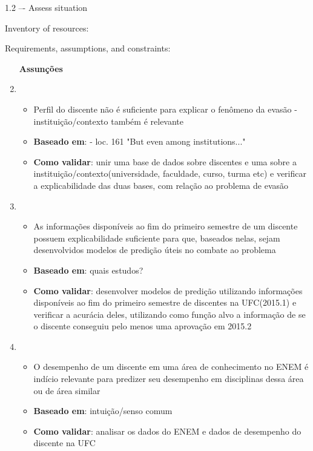 \documentclass{article}
\begin{document}
1.2 –- Assess situation

Inventory of resources:

Requirements, assumptions, and constraints:

\begin{enumerate}
\item [\textbf{Assunções}]
\item 
	\begin{itemize}
	\item Perfil do discente não é suficiente para explicar o fenômeno da evasão - instituição/contexto também é relevante
	\item \textbf{Baseado em}: \cite{tinto_leaving} - loc. 161 "But even among institutions..."
	\item \textbf{Como validar}: unir uma base de dados sobre discentes e uma sobre a instituição/contexto(universidade, faculdade, curso, turma etc) e verificar a explicabilidade das duas bases, com relação ao problema de evasão
	\end{itemize}

\item 
	\begin{itemize}
	\item As informações disponíveis ao fim do primeiro semestre de um discente possuem explicabilidade suficiente para que, baseados nelas, sejam desenvolvidos modelos de predição úteis no combate ao problema
	\item \textbf{Baseado em}: quais estudos? \cite{tinto_completing} 
	\item \textbf{Como validar}: desenvolver modelos de predição utilizando informações disponíveis ao fim do primeiro semestre de discentes na UFC(2015.1) e verificar a acurácia deles, utilizando como função alvo a informação de se o discente conseguiu pelo menos uma aprovação em 2015.2
	\end{itemize}

\item 
	\begin{itemize}
	\item O desempenho de um discente em uma área de conhecimento no ENEM é indício relevante para predizer seu desempenho em disciplinas dessa área ou de área similar
	\item \textbf{Baseado em}: intuição/senso comum
	\item \textbf{Como validar}: analisar os dados do ENEM e dados de desempenho do discente na UFC
	\end{itemize}
	

\end{enumerate}
\end{document}

